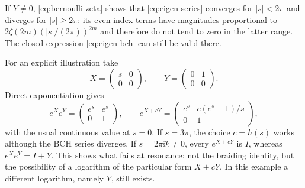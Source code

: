 If $Y\ne0$, \cref{eq:bernoulli-zeta} shows that \cref{eq:eigen-series} converges for $|s|<2\pi$ and diverges for $|s|\geq2\pi$: its even-index terms have magnitudes proportional to
$2\zeta(2m)(|s|/(2\pi))^{2m}$ and therefore do not tend to zero in the latter range. The closed expression \cref{eq:eigen-bch} can still be valid there.

For an explicit illustration take
\begin{equation}\label{eq:eigen-matrices}
 X=\begin{pmatrix}s&0\\0&0\end{pmatrix},\qquad
 Y=\begin{pmatrix}0&1\\0&0\end{pmatrix}.
\end{equation}
Direct exponentiation gives
\[
 e^Xe^Y=\begin{pmatrix}e^s&e^s\\0&1\end{pmatrix},\qquad
 e^{X+cY}=\begin{pmatrix}e^s&c(e^s-1)/s\\0&1\end{pmatrix},
\]
with the usual continuous value at $s=0$. If $s=3\pi$, the choice $c=h(s)$ works although the BCH series diverges. If $s=2\pi\ii k\ne0$, every $e^{X+cY}$ is $I$, whereas $e^Xe^Y=I+Y$. This shows what fails at resonance: not the braiding identity, but the possibility of a logarithm of the particular form $X+cY$. In this example a different logarithm, namely $Y$, still exists.
